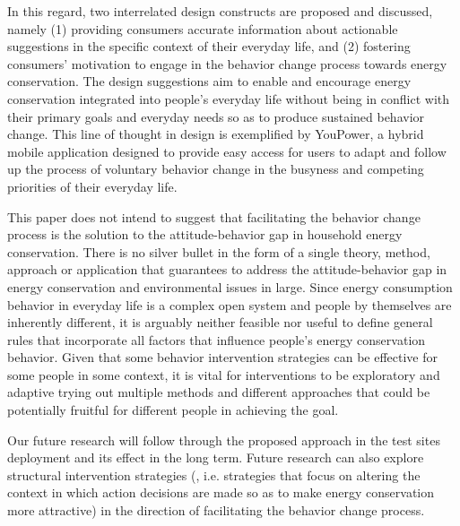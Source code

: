 \documentclass[a4paper]{article}
\begin{document}
In this regard, two interrelated design constructs are proposed and discussed, namely (1) providing consumers accurate information about actionable suggestions in the specific context of their everyday life, and (2) fostering consumers' motivation to engage in the behavior change process towards energy conservation. The design suggestions aim to enable and encourage energy conservation integrated into people's everyday life without being in conflict with their primary goals and everyday needs so as to produce sustained behavior change. This line of thought in design is exemplified by YouPower, a hybrid mobile application designed to provide easy access for users to adapt and follow up the process of voluntary behavior change in the busyness and competing priorities of their everyday life.

This paper does not intend to suggest that facilitating the behavior change process is the solution to the attitude-behavior gap in household energy conservation. There is no silver bullet in the form of a single theory, method, approach or application that guarantees to address the attitude-behavior gap in energy conservation and environmental issues in large. Since energy consumption behavior in everyday life is a complex open system and people by themselves are inherently different, it is arguably neither feasible nor useful to define general rules that incorporate all factors that influence people's energy conservation behavior. Given that some behavior intervention strategies can be effective for some people in some context, it is vital for interventions to be exploratory and adaptive trying out multiple methods and different approaches that could be potentially fruitful for different people in achieving the goal. 

Our future research will follow through the proposed approach in the test sites deployment and its effect in the long term. Future research can also explore structural intervention strategies (\cite{Steg2008}, i.e. strategies that focus on altering the context in which action decisions are made so as to make energy conservation more attractive) in the direction of facilitating the behavior change process. 

\printbibliography
\end{document}
